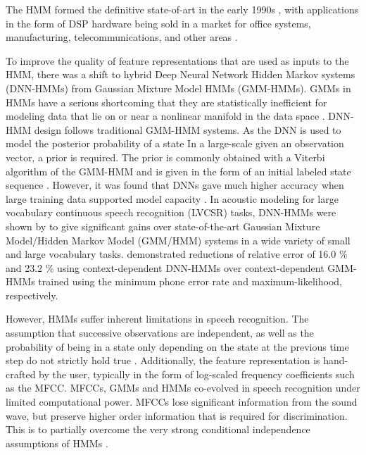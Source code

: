 \documentclass[12pt]{llncs}
\begin{document}
The HMM formed the definitive state-of-art in the early 1990s \cite{rabiner1989tutorial}, with applications in the form of DSP hardware being sold in a market for office systems, manufacturing, telecommunications, and other areas \cite[p.487]{rabiner1993fundamentals}. 



To improve the quality of feature representations that are used as inputs to the HMM, there was a shift to hybrid Deep Neural Network Hidden Markov systems (DNN-HMMs) from Gaussian Mixture Model HMMs (GMM-HMMs). GMMs in HMMs have a serious shortcoming that they are statistically inefficient for modeling data that lie on or near a nonlinear manifold in the data space \cite{hinton2012deep}.  DNN-HMM design follows traditional GMM-HMM systems. As the DNN is used to model the posterior probability of a state In a large-scale given an observation vector, a prior is required. The prior is commonly obtained with a Viterbi algorithm of the GMM-HMM and is given in the form of an initial labeled state sequence \cite{li2013hybrid}.  However, it was found that DNNs gave much higher accuracy when large training data supported model capacity \cite{deng2014achievements}.  In acoustic modeling for large vocabulary continuous speech recognition (LVCSR) tasks, DNN-HMMs were shown by \cite{dahl2012context}to give significant gains over state-of-the-art Gaussian Mixture Model/Hidden Markov Model (GMM/HMM) systems in a wide variety of small and large vocabulary tasks. \cite{dahl2012context}demonstrated reductions of relative error of 16.0 \% and 23.2 \% using context-dependent DNN-HMMs over context-dependent GMM-HMMs trained using the minimum phone error rate and maximum-likelihood, respectively.


However, HMMs suffer inherent limitations in speech recognition. The assumption that successive observations are independent, as well as the probability of being in a state only depending on the state at the previous time step do not strictly hold true \cite{rabiner1989tutorial}. Additionally, the feature representation is hand-crafted by the user, typically in the form of log-scaled frequency coefficients such as the MFCC. MFCCs, GMMs and HMMs co-evolved in speech recognition under limited computational power. MFCCs lose significant information from the sound wave, but preserve higher order information that is required for discrimination. This is to partially overcome the very strong conditional independence assumptions of HMMs \cite{mohamed2012acoustic}.
\end{document}

